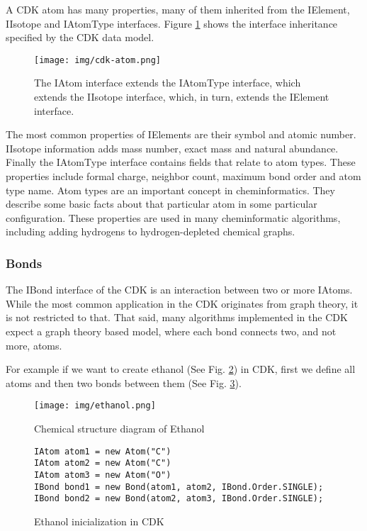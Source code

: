 \documentclass[thesis=M,english]{FITthesis}[2012/10/20]
\begin{document}
A CDK atom has many properties, many of them inherited from the IElement, IIsotope and IAtomType interfaces. Figure \ref{fig:cdkAtomModel} shows the interface inheritance specified by the CDK data model. 

\begin{figure}
  \centering
  \texttt{[image: img/cdk-atom.png]}
  \caption{The IAtom interface extends the IAtomType interface,
which extends the IIsotope interface, which, in turn, extends
the IElement interface.}
  \label{fig:cdkAtomModel}
\end{figure}

The most common properties of IElements are their symbol and atomic number. IIsotope information adds mass number, exact mass and natural abundance. Finally the IAtomType interface contains fields that relate to atom types. These properties include formal charge, neighbor count, maximum bond order and atom type name. Atom types are an important concept in cheminformatics. They describe some basic facts about that particular atom in some particular configuration. These properties are used in many cheminformatic algorithms, including adding hydrogens to hydrogen-depleted chemical graphs.\cite{cdk}

\subsubsection{Bonds}
The IBond interface of the CDK is an interaction between two or more IAtoms. While the most common application in the CDK originates from graph theory, it is not restricted to that. That said, many algorithms implemented in the CDK expect a graph theory based model, where each bond connects two, and not more, atoms.

For example if we want to create ethanol (See Fig. \ref{fig:ethanol}) in CDK, first we define all atoms and then two bonds between them (See Fig. \ref{cdkEthanolCode}).

\begin{figure}
  \centering
  \texttt{[image: img/ethanol.png]}
  \caption{Chemical structure diagram of Ethanol}
  \label{fig:ethanol}
\end{figure}

\begin{figure}
\begin{lstlisting}
IAtom atom1 = new Atom("C")
IAtom atom2 = new Atom("C")
IAtom atom3 = new Atom("O")
IBond bond1 = new Bond(atom1, atom2, IBond.Order.SINGLE);
IBond bond2 = new Bond(atom2, atom3, IBond.Order.SINGLE);
\end{lstlisting}
\caption{Ethanol inicialization in CDK}
\label{cdkEthanolCode}
\end{figure}
\end{document}
